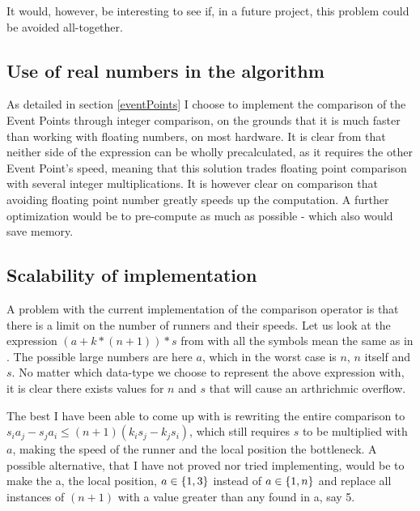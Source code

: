 It would, however, be interesting to see if, in a future project, this problem could be avoided all-together.

\subsection{Use of real numbers in the algorithm}
As detailed in section \ref{eventPoints} I choose to implement the comparison of the Event Points through integer comparison, on the grounds that it is much faster than working with floating numbers, on most hardware. It is clear from  that neither side of the expression can be wholly precalculated, as it requires the other Event Point's speed, meaning that this solution trades floating point comparison with several integer multiplications. It is however clear on comparison that avoiding floating point number greatly speeds up the computation. A further optimization would be to pre-compute as much as possible - which also would save memory.

\subsection{Scalability of implementation}
\label{scale}

A problem with the current implementation of the comparison operator is that there is a limit on the number of runners and their speeds. Let us look at the expression $(a + k * (n+1)) * s$ from  with all the symbols mean the same as in . The possible large numbers are here $a$, which in the worst case is $n$, $n$ itself and $s$. No matter which data-type we choose to represent the above expression with, it is clear there exists values for $n$ and $s$ that will cause an arthrichmic overflow.

The best I have been able to come up with is rewriting the entire comparison to $s_ia_j - s_ja_i \leq (n+1)(k_is_j - k_js_i)$, which still requires $s$ to be multiplied with $a$, making the speed of the runner and the local position the bottleneck. A possible alternative, that I have not proved nor tried implementing, would be to make the a, the local position, $a \in \{1, 3\}$ instead of $a \in \{1, n\}$ and replace all instances of $(n+1)$ with a value greater than any found in a, say 5. 
